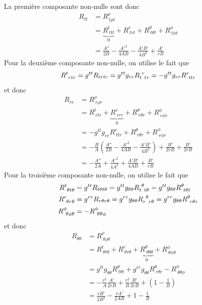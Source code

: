 \documentclass[a4paper,11pt]{report}
\theoremstyle{definition}
\theoremstyle{plain}
\theoremstyle{definition}
\theoremstyle{remark}
\begin{document}
        La première composante non-nulle sont donc
        \begin{align}
            R_{tt} &= R^\rho_{~t\rho t}\\
            &= \underbrace{R^t_{~tt t}}_{0} + R^r_{~tr t} + R^\theta_{~t\theta t} + R^\phi_{~t\phi t}\\
            &= \frac{A''}{2B}-\frac{A'^2}{4AB}-\frac{A'B'}{4B^2}+\frac{A'}{rB}
        \end{align}
        Pour la deuxième composante non-nulle, on utilise le fait que 
        \begin{equation}
            R^t_{~rtr} = g^{tt}R_{trtr} = g^{tt}g_{rr} R\indices{_t^r_t_r} = -g^{tt}g_{rr}R^r_{~ttr}
        \end{equation}
        et donc
        \begin{align}
            R_{rr} &= R^\rho_{~r\rho r}\\
            &= R^t_{~rtr} + \underbrace{R^r_{~rrr}}_{0} + R^\theta_{~r\theta r} + R^\phi_{~r\phi r}\\
            &= -g^{tt}g_{rr}R^r_{~ttr} + R^\theta_{~r\theta r} + R^\phi_{~r\phi r}\\
            &= -\frac{B}{A}\left(  \frac{A''}{2B}-\frac{A'^2}{4AB}-\frac{A'B'}{4B^2} \right)+\frac{B'}{2rB}+\frac{B'}{2rB}\\
            &= -\frac{A''}{2A}+\frac{A'^2}{4A^2}+\frac{A'B'}{4AB}+\frac{B'}{rB}
        \end{align}
        Pour la troisième composante non-nulle, on utilise le fait que
        \begin{align}
             R^t_{~\theta t\theta} &= g^{tt}R_{t\theta t\theta} = g^{tt}g_{\theta \theta}R\indices{_t^\theta_t_\theta} = g^{tt}g_{\theta\theta}R^\theta_{~t \theta t} \\
            R^r_{~\theta r\theta} &= g^{rr}R_{r\theta r\theta} = g^{rr}g_{\theta\theta}R\indices{_r^\theta_r_\theta} = g^{rr}g_{\theta\theta} R^\theta_{~r\theta r}\\
            R^\phi_{~\theta\phi\theta} &= -R^\phi_{~\theta\theta\phi}
        \end{align}
        et donc
        \begin{align}
            R_{\theta\theta} &= R^\rho_{~\theta\rho\theta}\\
            &= R^t_{~\theta t\theta} + R^r_{~\theta r\theta}+ \underbrace{R^\theta_{~\theta\theta\theta}}_{0} + R^\phi_{~\theta\phi\theta}\\
            &= g^{tt}g_{\theta\theta}R^\theta_{~t \theta t} + g^{rr}g_{\theta\theta} R^\theta_{~r\theta r} -R^\phi_{~\theta\theta\phi}\\
            &=-\frac{r^2}{A}\frac{A'}{2rB}+\frac{r^2}{B}\frac{B'}{2rB}+\left( 1-\frac{1}{B} \right)\\
            &= \frac{rB'}{2B^2}-\frac{rA'}{2AB}+1-\frac{1}{B}
        \end{align}
\end{document}
